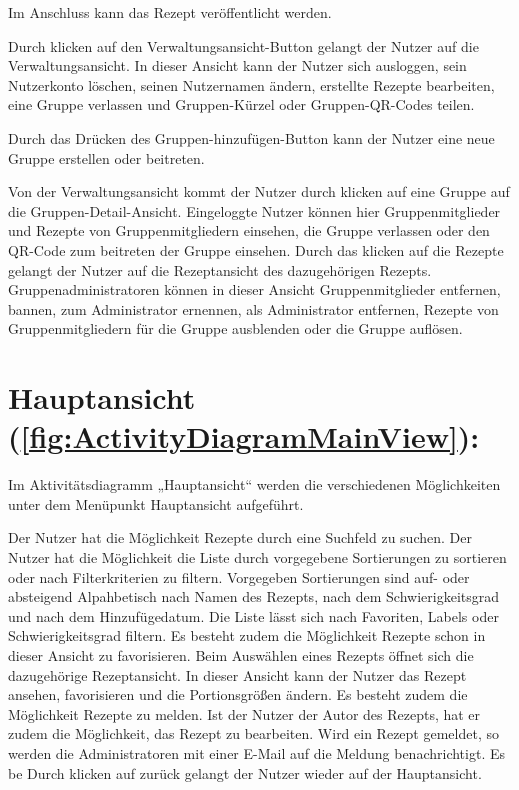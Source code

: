 \documentclass[parskip=full]{scrartcl}
\begin{document}
Im Anschluss kann das Rezept veröffentlicht werden.\par
Durch klicken auf den Verwaltungsansicht-Button
gelangt der Nutzer auf die Verwaltungsansicht.
In dieser Ansicht kann der Nutzer sich ausloggen, sein Nutzerkonto löschen, seinen Nutzernamen ändern,
erstellte Rezepte bearbeiten, eine Gruppe verlassen und Gruppen-Kürzel oder Gruppen-QR-Codes teilen.\par
Durch das Drücken des Gruppen-hinzufügen-Button kann der Nutzer eine neue Gruppe erstellen oder beitreten.

Von der Verwaltungsansicht kommt der Nutzer durch klicken auf eine Gruppe auf die Gruppen-Detail-Ansicht.
Eingeloggte Nutzer können hier Gruppenmitglieder und Rezepte von Gruppenmitgliedern einsehen, die Gruppe verlassen oder den QR-Code zum beitreten der Gruppe einsehen.
Durch das klicken auf die Rezepte gelangt der Nutzer auf die Rezeptansicht des dazugehörigen Rezepts.
Gruppenadministratoren können in dieser Ansicht Gruppenmitglieder entfernen, bannen, zum Administrator ernennen, als Administrator entfernen, Rezepte von Gruppenmitgliedern für die Gruppe ausblenden oder die Gruppe auflösen.\par



\section{Hauptansicht (\autoref{fig:ActivityDiagramMainView}):}

Im Aktivitätsdiagramm „Hauptansicht“
werden die verschiedenen Möglichkeiten unter dem Menüpunkt Hauptansicht aufgeführt.


Der Nutzer hat die Möglichkeit Rezepte durch eine Suchfeld zu suchen.
Der Nutzer hat die Möglichkeit die Liste durch vorgegebene Sortierungen zu sortieren oder nach Filterkriterien zu filtern.
Vorgegeben Sortierungen sind auf- oder absteigend Alpahbetisch nach Namen des Rezepts, nach dem Schwierigkeitsgrad und nach dem Hinzufügedatum.
Die Liste lässt sich nach Favoriten, \Gls{Labels} oder Schwierigkeitsgrad filtern.
Es besteht zudem die Möglichkeit Rezepte schon in dieser Ansicht zu favorisieren.\newline
Beim Auswählen eines Rezepts öffnet sich die dazugehörige Rezeptansicht.
In dieser Ansicht kann der Nutzer das Rezept ansehen, favorisieren und die Portionsgrößen ändern.
Es besteht zudem die Möglichkeit Rezepte zu melden.
Ist der Nutzer der Autor des Rezepts, hat er zudem die Möglichkeit, das Rezept zu bearbeiten.
Wird ein Rezept gemeldet, so werden die Administratoren mit einer E-Mail auf die Meldung benachrichtigt.\newline
Es be
Durch klicken auf zurück gelangt der Nutzer wieder auf der Hauptansicht.\par
\end{document}
